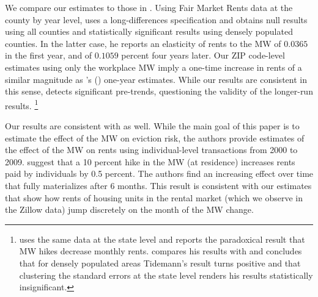 We compare our estimates to those in \textcite{Yamagishi2019, AgarwalEtAl2021}.
Using Fair Market Rents data at the county by year level, 
\textcite[][, Tables 1 and 2]{Yamagishi2019} uses a long-differences 
specification and obtains null results using all counties and statistically 
significant results using densely populated counties.
In the latter case, he reports an elasticity of rents to the MW of $0.0365$
in the first year, and of $0.1059$ percent four years later.
Our ZIP code-level estimates using only the workplace MW imply a one-time 
increase in rents of a similar magnitude as \citeauthor{Yamagishi2019}'s 
(\citeyear[][Table 2, Column 1]{Yamagishi2019}) one-year estimates.
While our results are consistent in this sense, 
\textcite[][Table 3]{Yamagishi2019} detects significant pre-trends,
questioning the validity of the longer-run results.%
\footnote{\textcite{Tidemann2018} uses the same data at the state level and 
reports the paradoxical result that MW hikes decrease monthly rents.
\textcite[][, Appendix C.1.3.]{Yamagishi2019} compares his results with 
\textcite{Tidemann2018} and concludes that for densely populated areas 
Tidemann's result turns positive and that clustering the standard errors at the
state level renders his results statistically insignificant.}

Our results are consistent with \textcite{AgarwalEtAl2021} as well.
While the main goal of this paper is to estimate the effect of the MW on eviction
risk, the authors provide estimates of the effect of the MW on rents using
individual-level transactions from 2000 to 2009.
\textcite[][, Figure 4]{AgarwalEtAl2021} suggest that a 10 percent hike 
in the MW (at residence) increases rents paid by individuals by 0.5 percent.
The authors find an increasing effect over time that fully materializes after 
6 months.
This result is consistent with our estimates that show how rents of housing 
units in the rental market (which we observe in the Zillow data) jump 
discretely on the month of the MW change.
